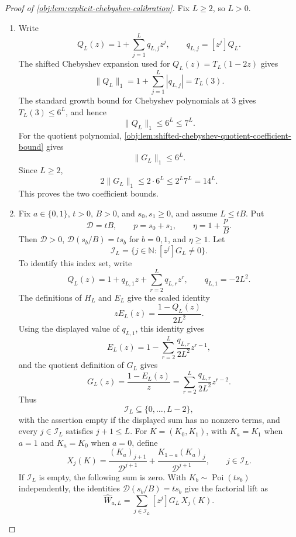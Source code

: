 \begin{proof}[Proof of \cref{obj:lem:explicit-chebyshev-calibration}]
Fix \(L\ge2\), so \(L>0\).
\begin{enumerate}
\item Write
\[
Q_L(z)=1+\sum_{j=1}^L q_{L,j}z^j,
\qquad q_{L,j}=[z^j]Q_L .
\]
The shifted Chebyshev expansion used for \(Q_L(z)=T_L(1-2z)\) gives
\[
\|Q_L\|_1
 =1+\sum_{j=1}^L |q_{L,j}|
 =T_L(3).
\]
The standard growth bound for Chebyshev polynomials at \(3\) gives \(T_L(3)\le 6^L\), and hence
\[
\|Q_L\|_1\le 6^L\le 7^L .
\]
For the quotient polynomial, \cref{obj:lem:shifted-chebyshev-quotient-coefficient-bound} gives
\[
\|G_L\|_1\le 6^L .
\]
Since \(L\ge2\),
\[
2\|G_L\|_1
 \le 2\cdot 6^L
 \le 2^L7^L
 =14^L .
\]
This proves the two coefficient bounds. %

\item Fix \(a\in\{0,1\}\), \(t>0\), \(B>0\), and \(s_0,s_1\ge0\), and assume \(L\le tB\). Put
\[
\mathscr D=tB,\qquad p=s_0+s_1,\qquad \eta=1+\frac pB .
\]
Then \(\mathscr D>0\), \(\mathscr D(s_b/B)=ts_b\) for \(b=0,1\), and \(\eta\ge1\). Let
\[
\mathscr I_L=\{j\in\mathbb N:[z^j]G_L\ne0\}.
\]
To identify this index set, write
\[
Q_L(z)=1+q_{L,1}z+\sum_{r=2}^L q_{L,r}z^r,
\qquad q_{L,1}=-2L^2.
\]
The definitions of \(H_L\) and \(E_L\) give the scaled identity
\[
zE_L(z)=\frac{1-Q_L(z)}{2L^2}.
\]
Using the displayed value of \(q_{L,1}\), this identity gives
\[
E_L(z)=1-\sum_{r=2}^L\frac{q_{L,r}}{2L^2}z^{r-1},
\]
and the quotient definition of \(G_L\) gives
\[
G_L(z)=\frac{1-E_L(z)}z
=\sum_{r=2}^L\frac{q_{L,r}}{2L^2}z^{r-2}.
\]
Thus
\[
\mathscr I_L\subseteq\{0,\ldots,L-2\},
\]
with the assertion empty if the displayed sum has no nonzero terms, and every \(j\in\mathscr I_L\) satisfies \(j+1\le L\). For \(K=(K_0,K_1)\), with \(K_a=K_1\) when \(a=1\) and \(K_a=K_0\) when \(a=0\), define
\[
X_j(K)
=
\frac{(K_a)_{j+1}}{\mathscr D^{j+1}}
+
\frac{K_{1-a}(K_a)_j}{\mathscr D^{j+1}},
\qquad j\in\mathscr I_L .
\]
If \(\mathscr I_L\) is empty, the following sum is zero. With \(K_b\sim\operatorname{Poi}(ts_b)\) independently, the identities \(\mathscr D(s_b/B)=ts_b\) give the factorial lift as
\[
\widehat W_{a,L}
=
\sum_{j\in\mathscr I_L} [z^j]G_L\,X_j(K).
\]


\end{enumerate}
\end{proof}
